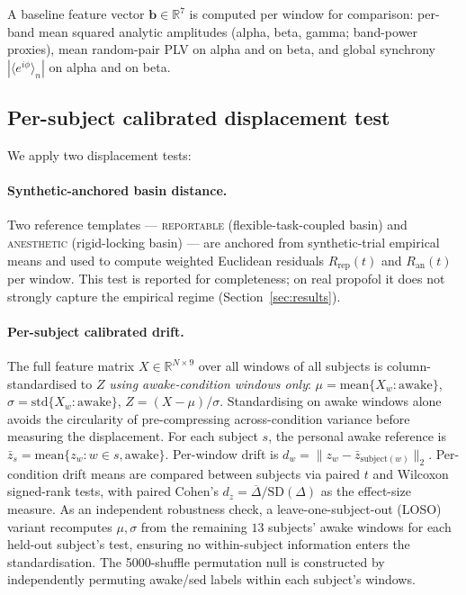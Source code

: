 \documentclass[11pt,a4paper]{article}
\begin{document}
A baseline feature vector $\mathbf{b}\in\mathbb{R}^7$ is computed per window for comparison: per-band mean squared analytic amplitudes (alpha, beta, gamma; band-power proxies), mean random-pair PLV on alpha and on beta, and global synchrony $|\langle e^{i\phi}\rangle_n|$ on alpha and on beta.

\subsection{Per-subject calibrated displacement test}

We apply two displacement tests:

\paragraph{Synthetic-anchored basin distance.}
Two reference templates --- \textsc{reportable} (flexible-task-coupled basin) and \textsc{anesthetic} (rigid-locking basin) --- are anchored from synthetic-trial empirical means and used to compute weighted Euclidean residuals $R_{\text{rep}}(t)$ and $R_{\text{an}}(t)$ per window. This test is reported for completeness; on real propofol it does not strongly capture the empirical regime (Section~\ref{sec:results}).

\paragraph{Per-subject calibrated drift.}
The full feature matrix $X\in\mathbb{R}^{N\times 9}$ over all windows of all subjects is column-standardised to $Z$ \emph{using awake-condition windows only}: $\mu = \mathrm{mean}\{X_w : \text{awake}\}$, $\sigma = \mathrm{std}\{X_w : \text{awake}\}$, $Z = (X-\mu)/\sigma$. Standardising on awake windows alone avoids the circularity of pre-compressing across-condition variance before measuring the displacement. For each subject $s$, the personal awake reference is $\bar{z}_s = \mathrm{mean}\{z_w : w\in s, \text{awake}\}$. Per-window drift is $d_w = \|z_w - \bar{z}_{\text{subject}(w)}\|_2$. Per-condition drift means are compared between subjects via paired $t$ and Wilcoxon signed-rank tests, with paired Cohen's $d_z = \overline{\Delta}/\mathrm{SD}(\Delta)$ as the effect-size measure. As an independent robustness check, a leave-one-subject-out (LOSO) variant recomputes $\mu,\sigma$ from the remaining $13$ subjects' awake windows for each held-out subject's test, ensuring no within-subject information enters the standardisation. The 5000-shuffle permutation null is constructed by independently permuting awake/sed labels within each subject's windows.
\end{document}
